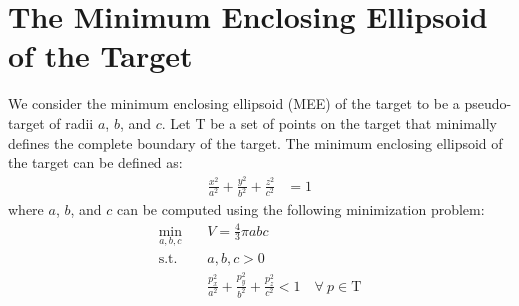 \section{The Minimum Enclosing Ellipsoid of the Target}
\label{app:mee}
We consider the minimum enclosing ellipsoid (MEE) \cite{kallberg2019minimum} of the target to be a pseudo-target of radii $a$, $b$, and $c$.
Let T be a set of points on the target that minimally defines the complete boundary of the target.
The minimum enclosing ellipsoid of the target can be defined as:
\begin{align}
    \frac{x^2}{a^2}+\frac{y^2}{b^2}+\frac{z^2}{c^2}&=1
\end{align}
where $a$, $b$, and $c$ can be computed using the following minimization problem:
\begin{equation}
\begin{aligned}
    \min_{a, b, c}\quad &V=\frac{4}{3}\pi abc\\
    \textrm{s.t. } & a,b,c>0\\
    & \frac{p_x^2}{a^2}+\frac{p_y^2}{b^2}+\frac{p_z^2}{c^2}<1\quad\forall\ p\in \text{T}
    \label{eqn:mee}
\end{aligned}
\end{equation}
